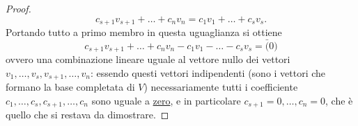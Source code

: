 \documentclass{book}
\begin{document}
\begin{proof}
  \begin{equation*}
    c_{s+1}v_{s+1}+\dots+c_nv_n=c_1v_1+\dots+c_sv_s.
  \end{equation*}
  Portando tutto a primo membro in questa uguaglianza si ottiene
  \begin{equation*}
    c_{s+1}v_{s+1}+\dots+c_nv_n-c_1v_1-\dots-c_sv_s=\bar(0)
  \end{equation*}
  ovvero una combinazione lineare uguale al vettore nullo dei vettori $v_1,\dots,v_s,v_{s+1},\dots,v_n$:
  essendo questi vettori indipendenti (sono i vettori che formano la base completata di $V$) necessariamente tutti
  i coefficiente $c_1,\dots,c_s,c_{s+1},\dots,c_n$ sono uguale a \underline{zero}, e in particolare $c_{s+1}=0,
  \dots,c_n=0$, che è quello che si restava da dimostrare.

\end{proof}
\end{document}
